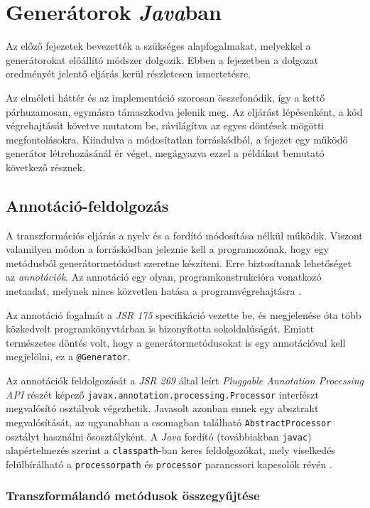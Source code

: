 \chapter{Generátorok \textit{Java}ban}

Az előző fejezetek bevezették a szükséges alapfogalmakat, melyekkel a generátorokat előállító módszer dolgozik. Ebben a fejezetben a dolgozat eredményét jelentő eljárás kerül részletesen ismertetésre.

Az elméleti háttér és az implementáció szorosan összefonódik, így a kettő párhuzamosan, egymásra támaszkodva jelenik meg. Az eljárást lépésenként, a kód végrehajtását követve mutatom be, rávilágítva az egyes döntések mögötti megfontolásokra. Kiindulva a módosítatlan forráskódból, a fejezet egy működő generátor létrehozásánál ér véget, megágyazva ezzel a példákat bemutató következő résznek.

\section{Annotáció-feldolgozás}

A transzformációs eljárás a nyelv és a fordító módosítása nélkül működik. Viszont valamilyen módon a forráskódban jeleznie kell a programozónak, hogy egy metódusból generátormetódust szeretne készíteni. Erre biztosítanak lehetőséget az \textit{annotációk}. Az annotáció egy olyan, programkonstrukcióra vonatkozó metaadat, melynek nincs közvetlen hatása a programvégrehajtásra \cite{JLS8}.

Az annotáció fogalmát a \textit{JSR 175} specifikáció vezette be, és megjelenése óta több közkedvelt programkönyvtárban is bizonyította sokoldalúságát. Emiatt természetes döntés volt, hogy a generátormetódusokat is egy annotációval kell megjelölni, ez a \texttt{@Generator}.

Az annotációk feldolgozását a \textit{JSR 269} által leírt \textit{Pluggable Annotation Processing API} részét képező \texttt{javax.annotation.processing.Processor} interfészt megvalósító osztályok végezhetik. Javasolt azonban ennek egy absztrakt megvalósítását, az ugyanabban a csomagban található \texttt{AbstractProcessor} osztályt használni ősosztályként. A \textit{Java} fordító (továbbiakban \texttt{javac}) alapértelmezés szerint a \texttt{classpath}-ban keres feldolgozókat, mely viselkedés felülbírálható a \texttt{processorpath} és \texttt{processor} parancssori kapcsolók révén \cite{JavacOptions}.

\subsection{Transzformálandó metódusok összegyűjtése}

